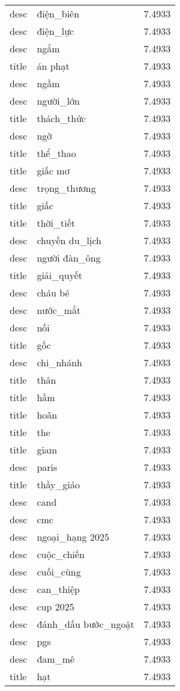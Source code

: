 \documentclass{article}
\begin{document}
\begin{tabular}{lll}
desc & điện\_biên & 7.4933\\
desc & điện\_lực & 7.4933\\
desc & ngắm & 7.4933\\
title & án phạt & 7.4933\\
desc & ngầm & 7.4933\\
desc & người\_lớn & 7.4933\\
title & thách\_thức & 7.4933\\
desc & ngờ & 7.4933\\
title & thể\_thao & 7.4933\\
title & giấc mơ & 7.4933\\
desc & trọng\_thương & 7.4933\\
title & giấc & 7.4933\\
title & thời\_tiết & 7.4933\\
desc & chuyến du\_lịch & 7.4933\\
desc & người đàn\_ông & 7.4933\\
title & giải\_quyết & 7.4933\\
desc & cháu bé & 7.4933\\
desc & nước\_mắt & 7.4933\\
desc & nối & 7.4933\\
title & gốc & 7.4933\\
desc & chi\_nhánh & 7.4933\\
title & thân & 7.4933\\
title & hầm & 7.4933\\
title & hoãn & 7.4933\\
title & the & 7.4933\\
title & giam & 7.4933\\
desc & paris & 7.4933\\
title & thầy\_giáo & 7.4933\\
desc & cand & 7.4933\\
desc & cmc & 7.4933\\
desc & ngoại\_hạng 2025 & 7.4933\\
desc & cuộc\_chiến & 7.4933\\
desc & cuối\_cùng & 7.4933\\
desc & can\_thiệp & 7.4933\\
desc & cup 2025 & 7.4933\\
desc & đánh\_dấu bước\_ngoặt & 7.4933\\
desc & pgs & 7.4933\\
desc & đam\_mê & 7.4933\\
title & hạt & 7.4933\\

\end{tabular}
\end{document}

